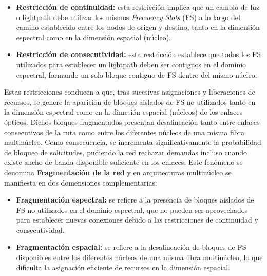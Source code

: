 \begin{itemize}
    \item \textbf{Restricción de continuidad:} esta restricción implica que un cambio de luz o lightpath debe utilizar los mismos \textit{Frecuency Slots} (FS) a lo largo del camino establecido entre los nodos de origen y destino, tanto en la dimensión espectral como en la dimensión espacial (núcleo).
    \item \textbf{Restricción de consecutividad:} esta restricción establece que todos los FS utilizados para establecer un lightpath deben ser contiguos en el dominio espectral, formando un solo bloque contiguo de FS dentro del mismo núcleo. 
\end{itemize}
%

Estas restricciones conducen a que, tras sucesivas asignaciones y liberaciones de recursos, se genere la aparición de bloques aislados de FS no utilizados tanto en la dimensión espectral como en la dimesión espacial (núcleos) de los enlaces ópticos.
Dichos bloques fragmentados presentan desalineación tanto entre enlaces consecutivos de la ruta como entre los diferentes núcleos de una misma fibra multinúcleo. Como consecuencia, se incrementa significativamente la probabilidad de bloqueo de solicitudes, 
pudiendo la red rechazar demandas incluso cuando existe ancho de banda disponible suficiente en los enlaces. Este fenómeno se denomina \textbf{Fragmentación de la red} y en arquitecturas multinúcleo se manifiesta en dos domensiones complementarias:
%

\begin{itemize}
    \item \textbf{Fragmentación espectral:} se refiere a la presencia de bloques aislados de FS no utilizados en el dominio espectral, que no pueden ser aprovechados para establecer nuevas conexiones debido a las restricciones de continuidad y consecutividad.
    \item \textbf{Fragmentación espacial:} se refiere a la desalineación de bloques de FS disponibles entre los diferentes núcleos de una misma fibra multinúcleo, lo que dificulta la asignación eficiente de recursos en la dimensión espacial.
\end{itemize}
%

